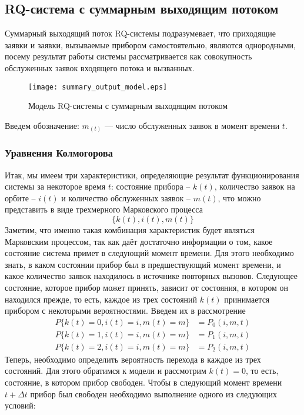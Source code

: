 \subsection{RQ-система с суммарным выходящим потоком}
Суммарный выходящий поток RQ-системы подразумевает, что приходящие заявки и заявки, вызываемые прибором самостоятельно, являются однородными, посему результат работы системы рассматривается как совокупность обслуженных заявок входящего потока и вызванных. 
\begin{figure}[H]
	\centering
	\texttt{[image: summary\_output\_model.eps]}
	\caption{Модель RQ-системы с суммарным выходящим потоком}
	\label{summary_output_model_fig}
\end{figure}
Введем обозначение: $m_(t)$ — число обслуженных заявок в момент времени $t$.


\subsubsection{Уравнения Колмогорова}
Итак, мы имеем три характеристики, определяющие результат функционирования системы за некоторое время $t$: состояние прибора – $k(t)$, количество заявок на орбите – $i(t)$ и количество обслуженных заявок – $m(t)$, что можно представить в виде трехмерного Марковского процесса
\begin{equation*}
	\{k(t),i(t),m(t)\}
\end{equation*}
Заметим, что именно такая комбинация характеристик будет являться Марковским процессом, так как даёт достаточно информации о том, какое состояние система примет в следующий момент времени. Для этого необходимо знать, в каком состоянии прибор был в предшествующий момент времени, и какое количество заявок находилось в источнике повторных вызовов.
Следующее состояние, которое прибор может принять, зависит от состояния, в котором он находился прежде, то есть, каждое из трех состояний $k(t)$ принимается прибором с некоторыми вероятностями. Введем их в рассмотрение
\begin{equation*}
	\begin{split}
		P\{k(t)=0,i(t)=i,m(t)=m\} &=P_{0}(i,m,t)\\
		P\{k(t)=1,i(t)=i,m(t)=m\} &=P_{1}(i,m,t)\\
		P\{k(t)=2,i(t)=i,m(t)=m\} &=P_{2}(i,m,t)
	\end{split}
\end{equation*}
Теперь, необходимо определить вероятность перехода в каждое из трех состояний. Для этого обратимся к модели и рассмотрим $k(t) = 0$, то есть, состояние, в котором прибор свободен. Чтобы в следующий момент времени $t+\Delta t$ прибор был свободен необходимо выполнение одного из следующих условий:
